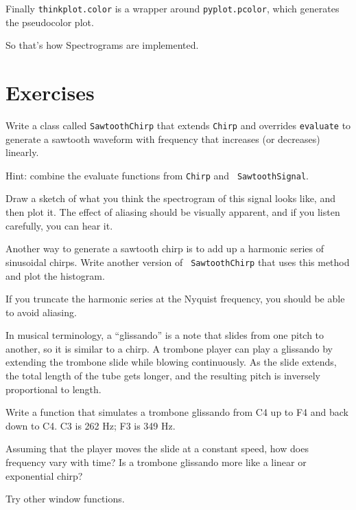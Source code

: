\documentclass[12pt]{book}
\begin{document}
Finally {\tt thinkplot.color} is a wrapper around {\tt pyplot.pcolor},
which generates the pseudocolor plot.

So that's how Spectrograms are implemented.


\section{Exercises}

\begin{exercise}
Write a class called {\tt SawtoothChirp} that extends {\tt Chirp}
and overrides {\tt evaluate} to generate a sawtooth waveform with
frequency that increases (or decreases) linearly.

Hint: combine the evaluate functions from {\tt Chirp} and {\tt
  SawtoothSignal}.

Draw a sketch of what you think the spectrogram of this signal
looks like, and then plot it.  The effect of aliasing should be
visually apparent, and if you listen carefully, you can hear it.
\end{exercise}

\begin{exercise}
Another way to generate a sawtooth chirp is to add up a harmonic
series of sinusoidal chirps.  Write another version of {\tt
  SawtoothChirp} that uses this method and plot the histogram.

If you truncate the harmonic series at the Nyquist frequency, you
should be able to avoid aliasing.
\end{exercise}


\begin{exercise}
In musical terminology, a ``glissando'' is a note that slides from one
pitch to another, so it is similar to a chirp.  A trombone player can
play a glissando by extending the trombone slide while blowing
continuously.  As the slide extends, the total length of the tube gets
longer, and the resulting pitch is inversely proportional to length.

Write a function that simulates a trombone glissando from C4 up to F4
and back down to C4.  C3 is 262 Hz; F3 is 349 Hz.

Assuming that the player moves the slide at a constant speed, how
does frequency vary with time?  Is a trombone glissando more like
a linear or exponential chirp?
\end{exercise}


\begin{exercise}
Try other window functions.
\end{exercise}
\end{document}
